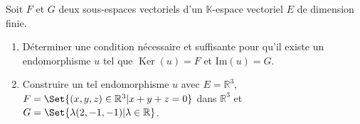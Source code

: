 Soit $F$ et $G$ deux sous-espaces vectoriels d'un $\mathbb K$-espace vectoriel $E$ de dimension finie.
\begin{enumerate}
  \item Déterminer une condition nécessaire et suffisante pour qu'il existe un
endomorphisme $u$ tel que $\mathop{\mathrm{Ker}}\nolimits(u)=F$ et $\mathrm{Im} (u)=G$.
 \item Construire un tel endomorphisme $u$ avec $E = \mathbb R^3$, $F=\Set{(x,y,z)\in\mathbb R^3 | x+y+z=0}$ dans $\mathbb R^3$ et $G=\Set{\lambda (2,-1,-1) | \lambda
\in\mathbb R}$.
\end{enumerate}

